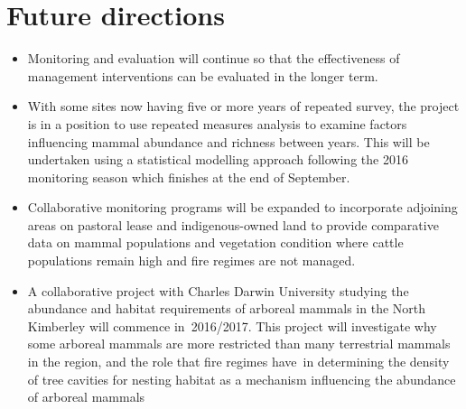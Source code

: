 \documentclass[version=last,
    paper=a4, %
    10pt, %
    usenames,
    dvipsnames,
    oneside, %
    headings=openany, %
    DIV=15 %
]{scrbook}
\begin{document}
\section*{Future directions}
\begin{itemize}
\itemsep1pt\parskip0pt
\item
  Monitoring and evaluation will continue so that the effectiveness of
  management interventions can be evaluated in the longer term.
\item
  With some sites now having five or more years of repeated survey, the
  project is in a position to use repeated measures analysis to examine
  factors influencing mammal abundance and richness between years. This
  will be undertaken using a statistical modelling approach following
  the 2016 monitoring season which finishes at the end of September.
\item
  Collaborative monitoring programs will be expanded to incorporate
  adjoining areas on pastoral lease and indigenous-owned land to provide
  comparative data on mammal populations and vegetation condition where
  cattle populations remain high and fire regimes are not managed.
\item
  A collaborative project with Charles Darwin University studying the
  abundance and habitat requirements of arboreal mammals in the North
  Kimberley will commence in~2016/2017. This project will investigate
  why some arboreal mammals are more restricted than many terrestrial
  mammals in the region, and the role that fire regimes have~in
  determining the density of tree cavities for nesting habitat as a
  mechanism influencing the abundance of arboreal mammals
\end{itemize}



\end{document}
